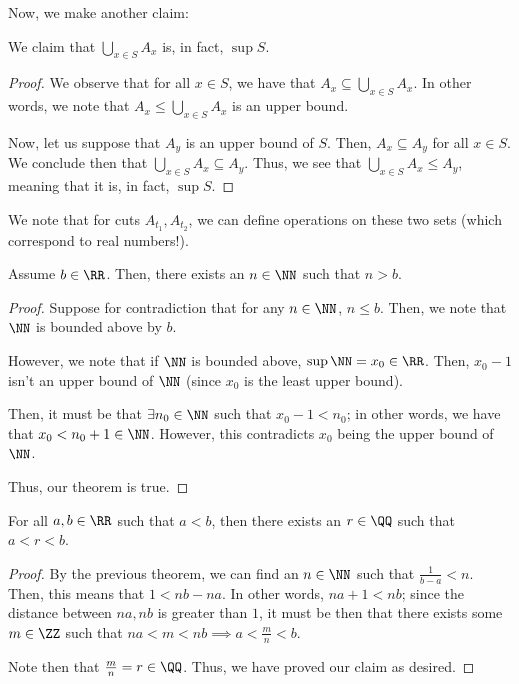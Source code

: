 \documentclass[openany]{book}
\begin{document}
Now, we make another claim:
\begin{prop}
	We claim that $\bigcup_{x \in S} A_x$ is, in fact, $\sup S$.
\end{prop}
\begin{proof}
	We observe that for all $x \in S$, we have that $A_x \subseteq \bigcup_{x \in S} A_x$. In other words, we note that $A_x \leq \bigcup_{x \in S} A_x$ is an upper bound.
	
	Now, let us suppose that $A_y$ is an upper bound of $S$. Then, $A_x \subseteq A_y$ for all $x \in S$. We conclude then that $\bigcup_{x \in S} A_x \subseteq A_y$. Thus, we see that $\bigcup_{x \in S} A_x \leq A_y$, meaning that it is, in fact, $\sup S$.
\end{proof}

\begin{rmk}
	We note that for cuts $A_{t_1}, A_{t_2}$, we can define operations on these two sets (which correspond to real numbers!).
\end{rmk}

\begin{thm}
	Assume $b \in \RR$. Then, there exists an $n \in \NN$ such that $n > b$.
\end{thm}
\begin{proof}
	Suppose for contradiction that for any $n \in \NN$, $n \leq b$. Then, we note that $\NN$ is bounded above by $b$.
	
	However, we note that if $\NN$ is bounded above, $\sup \NN = x_0 \in \RR$. Then, $x_0 - 1$ isn't an upper bound of $\NN$ (since $x_0$ is the least upper bound).
	
	Then, it must be that $\exists n_0 \in \NN$ such that $x_0 - 1 < n_0$; in other words, we have that $x_0 < n_0 + 1 \in \NN$. However, this contradicts $x_0$ being the upper bound of $\NN$.
	
	Thus, our theorem is true.
\end{proof}

\begin{thm}[$\QQ$ is Dense in $\RR$]
	For all $a,b \in \RR$ such that $a < b$, then there exists an $r \in \QQ$ such that $a < r < b$.
\end{thm}
\begin{proof}
	By the previous theorem, we can find an $n \in \NN$ such that $\frac{1}{b-a} < n$. Then, this means that $1 < nb - na$. In other words, $na + 1 < nb$; since the distance between $na, nb$ is greater than $1$, it must be then that there exists some $m \in \ZZ$ such that $na < m < nb \implies a < \frac{m}{n} < b$.
	
	Note then that $\frac{m}{n} = r \in \QQ$. Thus, we have proved our claim as desired.
\end{proof}
\end{document}
